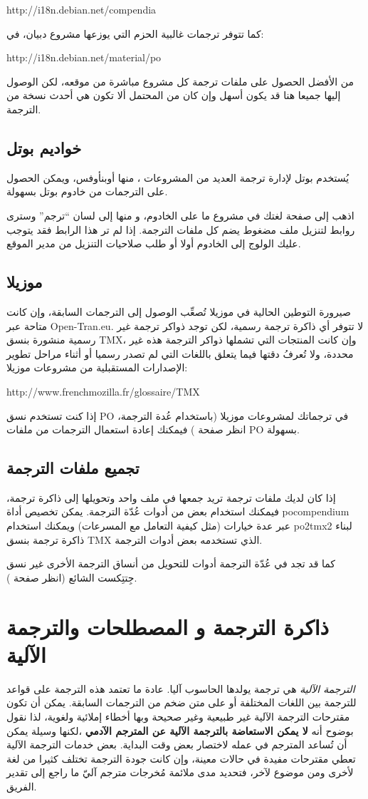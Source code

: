 http://i18n.debian.net/compendia

كما تتوفر ترجمات غالبية الحزم التي يوزعها مشروع دبيان، في:

http://i18n.debian.net/material/po

من الأفضل الحصول على ملفات ترجمة كل مشروع مباشرة من موقعه، لكن الوصول
إليها جميعا هنا قد يكون أسهل وإن كان من المحتمل ألا تكون هي أحدث نسخة
من الترجمة.

\subsection{خواديم بوتل}
يُستخدم بوتل لإدارة ترجمة العديد من المشروعات ، منها أوبن​أوفس، ويمكن
الحصول على الترجمات من خادوم بوتل بسهولة.

اذهب إلى صفحة لغتك في مشروع ما على الخادوم، و منها إلى لسان “ترجم” وسترى
روابط لتنزيل ملف مضغوط يضم كل ملفات الترجمة. إذا لم تر هذا الرابط فقد
يتوجب عليك الولوج إلى الخادوم أولا أو طلب صلاحيات التنزيل من مدير
الموقع.

\subsection{موزيلا}
صيرورة التوطين الحالية في موزيلا تُصعِّب الوصول إلى الترجمات السابقة،
وإن كانت متاحة عبر Open-Tran.eu. لا تتوفر أي ذاكرة ترجمة رسمية، لكن
توجد ذواكر ترجمة غير رسمية منشورة بنسق TMX، وإن كانت المنتجات التي
تشملها ذواكر الترجمة هذه غير محددة، ولا تُعرفُ دقتها فيما يتعلق باللغات
التي لم تصدر رسميا أو أثناء مراحل تطوير الإصدارات المستقبلية من مشروعات
موزيلا:

http://www.frenchmozilla.fr/glossaire/TMX

إذا كنت تستخدم نسق PO في ترجماتك لمشروعات موزيلا (باستخدام عُدة الترجمة،
انظر صفحة \at[ref:20165030]) فيمكنك إعادة استعمال الترجمات من
ملفات PO بسهولة.

\subsection{تجميع ملفات الترجمة}
إذا كان لديك ملفات ترجمة تريد جمعها في ملف واحد وتحويلها إلى ذاكرة
ترجمة، فيمكنك استخدام بعض من أدوات عُدّة الترجمة. يمكن تخصيص أداة
pocompendium عبر عدة خيارات (مثل كيفية التعامل مع المسرعات) ويمكنك
استخدام po2tmx2 لبناء ذاكرة ترجمة بنسق TMX الذي تستخدمه بعض أدوات
الترجمة.

كما قد تجد في عُدّة الترجمة أدوات للتحويل من أنساق الترجمة الأخرى غير
نسق جِتتِكست الشائع (انظر صفحة \at[ref:20165030]).

\section{ذاكرة الترجمة و المصطلحات والترجمة الآلية}
{\it الترجمة الآلية} هي ترجمة يولدها الحاسوب آليا. عادة ما تعتمد هذه
الترجمة على قواعد للترجمة بين اللغات المختلفة أو على متن ضخم من
الترجمات السابقة. يمكن أن تكون مقترحات الترجمة الآلية غير طبيعية وغير
صحيحة وبها أخطاء إملائية ولغوية، لذا نقول بوضوح أنه {\bf لا يمكن
الاستعاضة بالترجمة الآلية عن المترجم الآدمي} ،لكنها وسيلة يمكن أن
تُساعد المترجم في عمله لاختصار بعض وقت البداية. بعض خدمات الترجمة
الآلية تعطي مقترحات مفيدة في حالات معينة، وإن كانت جودة الترجمة تختلف
كثيرا من لغة لأخرى ومن موضوع لآخر، فتحديد مدى ملائمة مُخرجات مترجم آليّ
ما راجع إلى تقدير الفريق.

